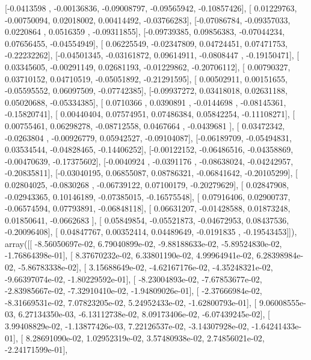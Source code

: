 \documentclass{article}
\begin{document}
       [-0.0413598 , -0.00136836, -0.09008797, -0.09565942, -0.10857426],
       [ 0.01229763, -0.00750094,  0.02018002,  0.00414492, -0.03766283],
       [-0.07086784, -0.09357033,  0.0220864 ,  0.0516359 , -0.09311855],
       [-0.09739385,  0.09856383, -0.07044234,  0.07656455, -0.04554949],
       [ 0.06225549, -0.02347809,  0.04724451,  0.07471753, -0.22232262],
       [-0.04501345, -0.03161872,  0.09614911, -0.0808447 , -0.19150471],
       [ 0.03345605, -0.00291149,  0.02681193, -0.01229862, -0.20706112],
       [ 0.00790327,  0.03710152,  0.04710519, -0.05051892, -0.21291595],
       [ 0.00502911,  0.00151655, -0.05595552,  0.06097509, -0.07742385],
       [-0.09937272,  0.03418018,  0.02631188,  0.05020688, -0.05334385],
       [ 0.0710366 ,  0.0390891 , -0.0144698 , -0.08145361, -0.15820741],
       [ 0.00440404,  0.07574951,  0.07486384,  0.05842254, -0.11108271],
       [ 0.00755461,  0.06298278, -0.08712558,  0.0467664 , -0.0439681 ],
       [ 0.03472342, -0.0263804 , -0.00926779,  0.05942527, -0.09104087],
       [-0.06189709, -0.05494831,  0.03534544, -0.04828465, -0.14406252],
       [-0.00122152, -0.06486516, -0.04358869, -0.00470639, -0.17375602],
       [-0.0040924 , -0.0391176 , -0.08638024, -0.04242957, -0.20835811],
       [-0.03040195,  0.06855087,  0.08786321, -0.06841642, -0.20105299],
       [ 0.02804025, -0.0830268 , -0.06739122,  0.07100179, -0.20279629],
       [ 0.02847908, -0.02943365,  0.10146189, -0.07385015, -0.16575548],
       [ 0.07916406,  0.02900737, -0.06574594,  0.07793891, -0.06848118],
       [ 0.06631207, -0.01428588,  0.01873248,  0.01850641, -0.0662683 ],
       [ 0.05849854, -0.05521873, -0.04672953,  0.08437536, -0.20096408],
       [ 0.04847767,  0.00352414,  0.04489649, -0.0191835 , -0.19543453]]), array([[ -8.56050697e-02,   6.79040899e-02,  -9.88188633e-02,
         -5.89524830e-02,  -1.76864398e-01],
       [  8.37670232e-02,   6.33801190e-02,   4.99964941e-02,
          6.28398984e-02,  -5.86783338e-02],
       [  3.15688649e-02,  -4.62167176e-02,  -4.35248321e-02,
         -9.66397074e-02,  -1.80229592e-01],
       [ -8.23004893e-02,  -7.67853677e-02,  -2.83985667e-02,
         -7.32910410e-02,  -1.94809026e-01],
       [ -2.37666984e-02,  -8.31669531e-02,   7.07823205e-02,
          5.24952433e-02,  -1.62800793e-01],
       [  9.06008555e-03,   6.27134350e-03,  -6.13112738e-02,
          8.09173406e-02,  -6.07439245e-02],
       [  3.99408829e-02,  -1.13877426e-03,   7.22126537e-02,
         -3.14307928e-02,  -1.64241433e-01],
       [  8.28691090e-02,   1.02952319e-02,   3.57480938e-02,
          2.74856021e-02,  -2.24171599e-01],
\end{document}
